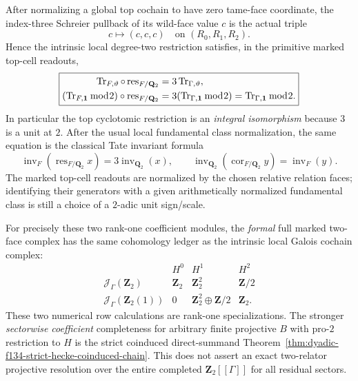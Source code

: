 \begin{theorem}
After normalizing
a global top
cochain to have
zero tame-face
coordinate, the
index-three
Schreier pullback
of its wild-face
value $c$ is the
actual triple
\begin{equation}\label{eq:dyadic-f134-three-face-restriction}
\boxed{\qquad
c\longmapsto(c,c,c)
\quad\text{on }
(R_0,R_1,R_2).
\qquad}
\end{equation}
Hence the
intrinsic local
degree-two
restriction
satisfies, in
the primitive
marked top-cell
readouts,
\begin{equation}\label{eq:dyadic-f134-trace-restriction-three}
\boxed{
\begin{aligned}
\operatorname{Tr}_{F,\vartheta}
\circ\operatorname{res}_{F/\mathbf Q_2}
&=
3\operatorname{Tr}_{\Gamma,\vartheta},\\
(\operatorname{Tr}_{F,\bf1}\bmod2)
\circ\operatorname{res}_{F/\mathbf Q_2}
&=
3(\operatorname{Tr}_{\Gamma,\bf1}\bmod2)
=
\operatorname{Tr}_{\Gamma,\bf1}\bmod2.
\end{aligned}}
\end{equation}
In particular the
top cyclotomic
restriction
is an \emph{integral
isomorphism}
because $3$ is
a unit at $2$.
After the usual
local fundamental
class normalization,
the same equation
is the classical
Tate invariant
formula
\begin{equation}\label{eq:dyadic-f134-local-tate-trace-normalization}
\operatorname{inv}_{F}
(\operatorname{res}_{F/\mathbf Q_2}x)
=
3\operatorname{inv}_{\mathbf Q_2}(x),
\qquad
\operatorname{inv}_{\mathbf Q_2}
(\operatorname{cor}_{F/\mathbf Q_2}y)
=
\operatorname{inv}_{F}(y).
\end{equation}
The marked top-cell
readouts are normalized
by the chosen
relative relation
faces; identifying
their generators
with a given
arithmetically
normalized
fundamental class
is still a choice
of a $2$-adic
unit sign/scale.

For precisely these
two rank-one
coefficient modules,
the \emph{formal}
full marked
two-face complex
has the same
cohomology ledger
as the intrinsic
local Galois
cochain complex:
\begin{equation}\label{eq:dyadic-f134-global-rankone-ledgers}
\begin{array}{c|ccc}
&H^0&H^1&H^2\\ \hline
\mathcal J_\Gamma(\mathbf Z_2)
&\mathbf Z_2&\mathbf Z_2^2&\mathbf Z/2\\
\mathcal J_\Gamma(\mathbf Z_2(1))
&0&\mathbf Z_2^2\oplus\mathbf Z/2&
\mathbf Z_2 .
\end{array}
\end{equation}
These two numerical
row calculations
are rank-one
specializations.
The stronger
\emph{sectorwise
coefficient}
completeness for
arbitrary finite
projective $B$
with pro-$2$
restriction to $H$
is the strict
coinduced
direct-summand
Theorem~\ref{thm:dyadic-f134-strict-hecke-coinduced-chain}.
This does not
assert an exact
two-relator
projective resolution
over the entire
completed
$\mathbf Z_2[[\Gamma]]$
for all residual
sectors.
\end{theorem}

